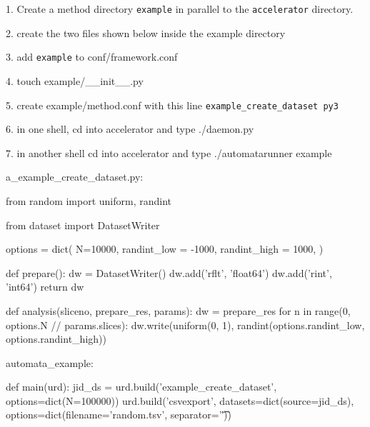 1. Create a method directory \texttt{example} in parallel to the
\texttt{accelerator} directory.

2. create the two files shown below inside the example directory

3. add \texttt{example} to conf/framework.conf

4. touch example/__init__.py

5. create example/method.conf with this line
\texttt{example_create_dataset   py3}

6. in one shell, cd into accelerator and type ./daemon.py

7. in another shell cd into accelerator and type ./automatarunner example



a_example_create_dataset.py:
\begin{python}
 from random import uniform, randint

 from dataset import DatasetWriter

options = dict(
    N=10000,
    randint_low = -1000,
    randint_high = 1000,
)

 def prepare():
    dw = DatasetWriter()
    dw.add('rflt', 'float64')
    dw.add('rint', 'int64')
    return dw

def analysis(sliceno, prepare_res, params):
    dw = prepare_res
    for n in range(0, options.N // params.slices):
        dw.write(uniform(0, 1), randint(options.randint_low, options.randint_high))
\end{python}


automata_example:
\begin{python}
def main(urd):
    jid_ds = urd.build('example_create_dataset', options=dict(N=100000))
    urd.build('csvexport', datasets=dict(source=jid_ds), options=dict(filename='random.tsv', separator='\t'))
\end{python}
